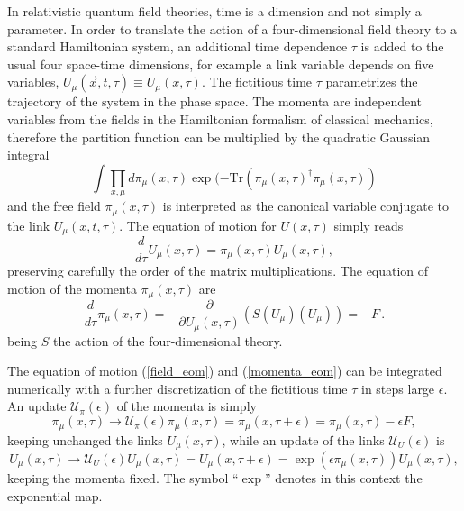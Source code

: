 \documentclass[11pt,a4paper]{article}
\begin{document}
In relativistic quantum field theories, time is a dimension and not simply a parameter. In order to translate the action of a four-dimensional field theory to a standard Hamiltonian system, an additional time dependence $\tau$ is added to the usual four space-time dimensions, for example a link variable depends on five variables, $U_\mu(\vec{x},t,\tau) \equiv U_\mu(x,\tau)$. The fictitious time $\tau$ parametrizes the trajectory of the system in the phase space. The momenta are independent variables from the fields in the Hamiltonian formalism of classical mechanics, therefore the partition function can be multiplied by the quadratic Gaussian integral
\begin{equation*}
\int \prod_{x, \mu} d \pi_\mu(x,\tau) \exp(- \textrm{Tr}(\pi_\mu(x,\tau)^\dag \pi_\mu(x,\tau))
\end{equation*}
and the free field $\pi_\mu(x,\tau)$ is interpreted as the canonical variable conjugate to the link $U_\mu(x,t,\tau)$. The equation of motion for $U(x,\tau)$ simply reads
\begin{equation}\label{field_eom}
\frac{d}{d \tau} U_\mu(x,\tau) = \pi_\mu(x,\tau) U_\mu(x,\tau),
\end{equation}
preserving carefully the order of the matrix multiplications. The equation of motion of the momenta $\pi_\mu(x,\tau)$ are
\begin{equation}\label{momenta_eom}
\frac{d}{d \tau} \pi_\mu(x,\tau) = - \frac{\partial}{\partial U_\mu(x,\tau)} \left( S(U_\mu)(U_\mu) \right) = - F\,.
\end{equation}
being $S$ the action of the four-dimensional theory.

The equation of motion (\ref{field_eom}) and (\ref{momenta_eom}) can be integrated numerically with a further discretization of the fictitious time $\tau$ in steps large $\epsilon$. An update $\mathcal{U}_\pi(\epsilon)$ of the momenta is simply
\begin{equation*}
\pi_\mu(x,\tau) \rightarrow \mathcal{U}_\pi(\epsilon) \pi_\mu(x,\tau) = \pi_\mu(x,\tau + \epsilon) = \pi_\mu(x,\tau) - \epsilon F,
\end{equation*}
keeping unchanged the links $U_\mu(x,\tau)$, while an update of the links $\mathcal{U}_U(\epsilon)$ is
\begin{equation*}
U_\mu(x,\tau) \rightarrow \mathcal{U}_U(\epsilon) U_\mu(x,\tau) = U_\mu(x,\tau + \epsilon) = \exp{(\epsilon \pi_\mu(x,\tau))} U_\mu(x,\tau),
\end{equation*}
keeping the momenta fixed. The symbol ``$\exp$'' denotes in this context the exponential map.
\end{document}
